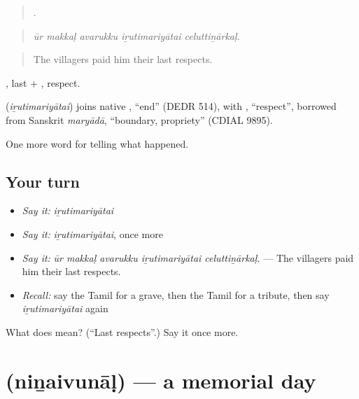 \begin{quote}
    .
\end{quote}

\begin{quote}
\emph{ūr makkaḷ avarukku iṟutimariyātai celuttiṉārkaḷ.}
\end{quote}

\begin{quote}
The villagers paid him their last respects.
\end{quote}

, last + , respect.

\begin{cousinweb}
\textbf{} (\emph{iṟutimariyātai}) joins native , \textquotedblleft{}end\textquotedblright{} (DEDR 514), with , \textquotedblleft{}respect\textquotedblright{}, borrowed from Sanskrit \emph{maryādā}, \textquotedblleft{}boundary, propriety\textquotedblright{} (CDIAL 9895).
\end{cousinweb}

\begin{grammarlens}[title={What you've built}]
One more word for telling what happened.
\end{grammarlens}

\subsection*{Your turn}
\begin{itemize}
\raggedright
  \item \emph{Say it:} \emph{iṟutimariyātai}
  \item \emph{Say it:} \emph{iṟutimariyātai}, once more
  \item \emph{Say it:} \emph{ūr makkaḷ avarukku iṟutimariyātai celuttiṉārkaḷ.} — The villagers paid him their last respects.
  \item \emph{Recall:} say the Tamil for a grave, then the Tamil for a tribute, then say \emph{iṟutimariyātai} again
\end{itemize}

\begin{tcolorbox}[breakable,colback=teal!4,colframe=teal!35!black,title={Before you move on}]
What does  mean? (\textquotedblleft{}Last respects\textquotedblright{}.) Say it once more.
\end{tcolorbox}
\section[\texorpdfstring{\ta{நினைவுநாள்} (niṉaivunāḷ)}{நினைவுநாள் (niṉaivunāḷ)}]{ (niṉaivunāḷ) — a memorial day}

